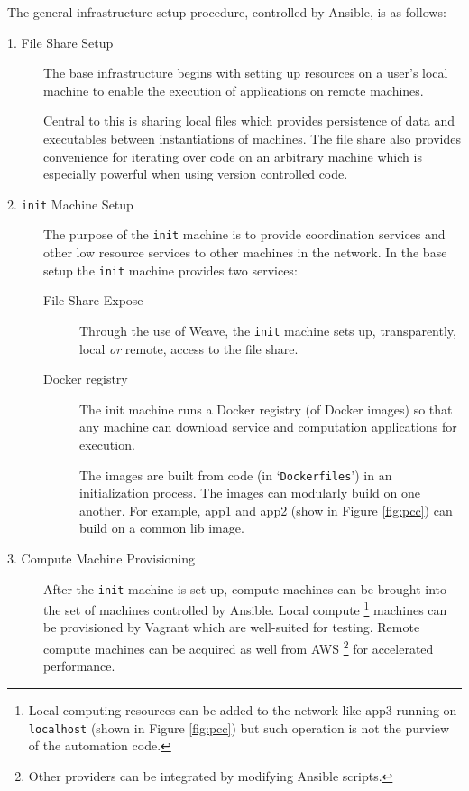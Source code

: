 The general infrastructure setup procedure, controlled by \textsf{Ansible}, is as follows:

\begin{description}

\item[1. File Share Setup] \hfill 

The base infrastructure begins with setting up resources on a user's local machine to enable the execution of applications on remote machines.


Central to this is sharing local files which provides persistence of data and executables between instantiations of machines.
%
The file share also provides convenience for iterating over code on an arbitrary machine which is especially powerful when using version controlled code.


\item[2. \texttt{init} Machine Setup] \hfill

  The purpose of the \texttt{init} machine is to provide coordination services and other low resource services to other machines in the network.
%
In the base setup the \texttt{init} machine provides two services:

  \begin{description}

    \item[File Share Expose] \hfill

      Through the use of \textsf{Weave}, the \texttt{init} machine sets up, transparently, local \emph{or} remote, access to the file share.

    \item[\textsf{Docker} registry] \hfill

      The \textsf{init} machine runs a \textsf{Docker} registry (of \textsf{Docker} images) so that any machine can download service and computation applications for execution.

      The images are built from code (in `\texttt{Dockerfiles}') in an initialization process.
      The images can modularly build on one another.
      For example, \textsf{app1} and \textsf{app2} (show in Figure \ref{fig:pcc}) can build on a common \textsf{lib} image.

  \end{description}


\item[3. Compute Machine Provisioning] \hfill

After the \texttt{init} machine is set up, compute machines can be brought into the set of machines controlled by \textsf{Ansible}.
%
Local compute%
\footnote{
Local computing resources can be added to the network like \textsf{app3} running on \texttt{localhost} (shown in Figure \ref{fig:pcc}) but such operation is not the purview of the automation code.
}
machines can be provisioned by \textsf{Vagrant} which are well-suited for testing.
%
Remote compute machines can be acquired as well from \textsf{AWS}%
\footnote{
Other providers can be integrated by modifying \textsf{Ansible} scripts.
}
for accelerated performance.


\end{description}


